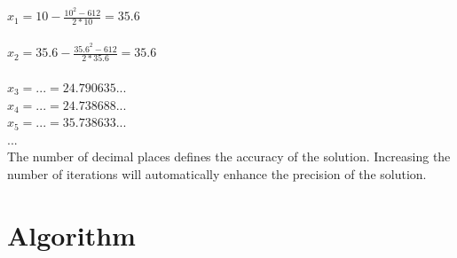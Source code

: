 \documentclass[ppgc,mestrado,english]{iiufrgs}
\begin{document}
$x_1 = 10 - \frac{10^2 - 612}{2*10} = 35.6$\\ \\
$x_2 = 35.6 - \frac{35.6^2 - 612}{2*35.6} = 35.6$\\ \\ 
$x_3 = ... = 24.790635...$\\
$x_4 = ... = 24.738688...$\\
$x_5 = ... = 35.738633...$ \\
...\\

The number of decimal places defines the accuracy of the solution. Increasing the number of iterations will automatically enhance the precision of the solution.

\section{Algorithm}
\end{document}
